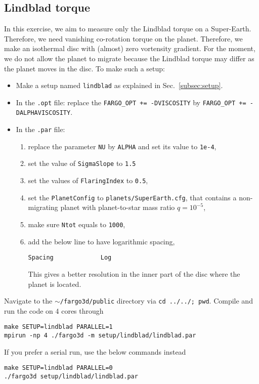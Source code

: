 \documentclass[14pt]{scrartcl}
\begin{document}
\subsection{Lindblad torque} \label{subsec:lindblad}
In this exercise, we aim to measure only the Lindblad torque on a Super-Earth. Therefore, we need vanishing co-rotation torque on the planet. Therefore, we make an isothermal disc with (almost) zero vortensity gradient. For the moment, we do not allow the planet to migrate because the Lindblad torque may differ as the planet moves in the disc. To make such a setup:
\begin{itemize}
	\item Make a setup named \texttt{lindblad} as explained in Sec.~\ref{subsec:setup}.
	\item In the \texttt{.opt} file: replace the \texttt{FARGO\_OPT += -DVISCOSITY}  by \texttt{FARGO\_OPT += -DALPHAVISCOSITY}.
	\item In the \texttt{.par} file:
	\begin{enumerate}
	\item replace the parameter \texttt{NU} by \texttt{ALPHA} and set its value to \texttt{1e-4},
	\item set the value of \texttt{SigmaSlope} to \texttt{1.5}
	\item set the values of \texttt{FlaringIndex} to \texttt{0.5},
	\item set the \texttt{PlanetConfig} to \texttt{planets/SuperEarth.cfg}, that contains a non-migrating planet with planet-to-star mass ratio $q=10^{-5}$,
	\item make sure \texttt{Ntot} equals to \texttt{1000},
	\item add the below line to have logarithmic spacing,
	\begin{verbatim}
Spacing             Log
	\end{verbatim}
	This gives a better resolution in the inner part of the disc where the planet is located.
    \end{enumerate} 
\end{itemize}

Navigate to the \texttt{$\sim$/fargo3d/public} directory via \texttt{cd ../../; pwd}. Compile and run the code on 4 cores through
\begin{verbatim}
make SETUP=lindblad PARALLEL=1
mpirun -np 4 ./fargo3d -m setup/lindblad/lindblad.par
\end{verbatim}
If you prefer a serial run, use the below commands instead
\begin{verbatim}
make SETUP=lindblad PARALLEL=0
./fargo3d setup/lindblad/lindblad.par
\end{verbatim}
\end{document}
